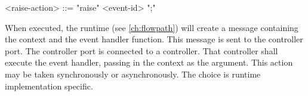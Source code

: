 \begin{minip}
\begin{grammar}
<raise-action> ::= "raise" <event-id> ";"
\end{grammar}
\end{minip}

When executed, the runtime (see \ref{ch:flowpath}) will create a message containing the context and the event handler function. This message is sent to the controller port. The controller port is connected to a controller. That controller shall execute the event handler, passing in the context as the argument. This action may be taken synchronously or asynchronously. The choice is runtime implementation specific.

